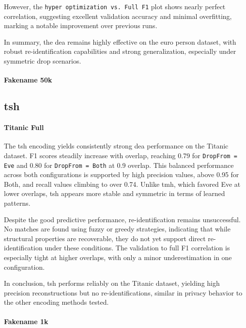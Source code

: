 However, the \texttt{hyper optimization vs. Full F1} plot shows nearly perfect correlation, suggesting excellent validation accuracy and minimal overfitting, marking a notable improvement over previous runs.

In summary, the \ac{dea} remains highly effective on the euro person dataset, with robust re-identification capabilities and strong generalization, especially under symmetric drop scenarios.

\paragraph{Fakename 50k}


\subsection{\ac{tsh}}

\paragraph{Titanic Full}

The \ac{tsh} encoding yields consistently strong \ac{dea} performance on the Titanic dataset.
F1 scores steadily increase with overlap, reaching 0.79 for \texttt{DropFrom = Eve} and 0.80 for \texttt{DropFrom = Both} at 0.9 overlap.
This balanced performance across both configurations is supported by high precision values, above 0.95 for Both, and recall values climbing to over 0.74.
Unlike \ac{tmh}, which favored Eve at lower overlaps, \ac{tsh} appears more stable and symmetric in terms of learned patterns.

Despite the good predictive performance, re-identification remains unsuccessful.
No matches are found using fuzzy or greedy strategies, indicating that while structural properties are recoverable, they do not yet support direct re-identification under these conditions.
The validation to full F1 correlation is especially tight at higher overlaps, with only a minor underestimation in one configuration.

In conclusion, \ac{tsh} performs reliably on the Titanic dataset, yielding high precision reconstructions but no re-identifications, similar in privacy behavior to the other encoding methods tested.

\paragraph{Fakename 1k}

